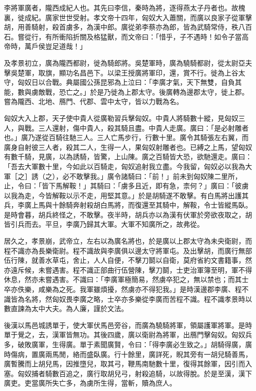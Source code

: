 
\begin{pinyinscope}
李將軍廣者，隴西成紀人也。其先曰李信，秦時為將，逐得燕太子丹者也。故槐裏，徙成紀。廣家世世受射。孝文帝十四年，匈奴大入蕭關，而廣以良家子從軍擊胡，用善騎射，殺首虜多，為漢中郎。廣從弟李蔡亦為郎，皆為武騎常侍，秩八百石。嘗從行，有所衝陷折關及格猛獸，而文帝曰：「惜乎，子不遇時！如令子當高帝時，萬戶侯豈足道哉！」

及孝景初立，廣為隴西都尉，徙為騎郎將。吳楚軍時，廣為驍騎都尉，從太尉亞夫擊吳楚軍，取旗，顯功名昌邑下。以梁王授廣將軍印，還，賞不行。徙為上谷太守，匈奴日以合戰。典屬國公孫昆邪為上泣曰：「李廣才氣，天下無雙，自負其能，數與虜敵戰，恐亡之。」於是乃徙為上郡太守。後廣轉為邊郡太守，徙上郡。嘗為隴西、北地、鴈門、代郡、雲中太守，皆以力戰為名。

匈奴大入上郡，天子使中貴人從廣勒習兵擊匈奴。中貴人將騎數十縱，見匈奴三人，與戰。三人還射，傷中貴人，殺其騎且盡。中貴人走廣。廣曰：「是必射雕者也。」廣乃遂從百騎往馳三人。三人亡馬步行，行數十里。廣令其騎張左右翼，而廣身自射彼三人者，殺其二人，生得一人，果匈奴射雕者也。已縛之上馬，望匈奴有數千騎，見廣，以為誘騎，皆驚，上山陳。廣之百騎皆大恐，欲馳還走。廣曰：「吾去大軍數十里，今如此以百騎走，匈奴追射我立盡。今我留，匈奴必以我為大軍［之］誘（之），必不敢擊我。」廣令諸騎曰：「前！」前未到匈奴陳二里所，止，令曰：「皆下馬解鞍！」其騎曰：「虜多且近，即有急，柰何？」廣曰：「彼虜以我為走，今皆解鞍以示不走，用堅其意。」於是胡騎遂不敢擊。有白馬將出護其兵，李廣上馬與十餘騎奔射殺胡白馬將，而復還至其騎中，解鞍，令士皆縱馬臥。是時會暮，胡兵終怪之，不敢擊。夜半時，胡兵亦以為漢有伏軍於旁欲夜取之，胡皆引兵而去。平旦，李廣乃歸其大軍。大軍不知廣所之，故弗從。

居久之，孝景崩，武帝立，左右以為廣名將也，於是廣以上郡太守為未央衛尉，而程不識亦為長樂衛尉。程不識故與李廣俱以邊太守將軍屯。及出擊胡，而廣行無部伍行陳，就善水草屯，舍止，人人自便，不擊刀鬬以自衛，莫府省約文書籍事，然亦遠斥候，未嘗遇害。程不識正部曲行伍營陳，擊刀鬬，士吏治軍簿至明，軍不得休息，然亦未嘗遇害。不識曰：「李廣軍極簡易，然虜卒犯之，無以禁也；而其士卒亦佚樂，咸樂為之死。我軍雖煩擾，然虜亦不得犯我。」是時漢邊郡李廣、程不識皆為名將，然匈奴畏李廣之略，士卒亦多樂從李廣而苦程不識。程不識孝景時以數直諫為太中大夫。為人廉，謹於文法。

後漢以馬邑城誘單于，使大軍伏馬邑旁谷，而廣為驍騎將軍，領屬護軍將軍。是時單于覺之，去，漢軍皆無功。其後四歲，廣以衛尉為將軍，出鴈門擊匈奴。匈奴兵多，破敗廣軍，生得廣。單于素聞廣賢，令曰：「得李廣必生致之。」胡騎得廣，廣時傷病，置廣兩馬閒，絡而盛臥廣。行十餘里，廣詳死，睨其旁有一胡兒騎善馬，廣暫騰而上胡兒馬，因推墮兒，取其弓，鞭馬南馳數十里，復得其餘軍，因引而入塞。匈奴捕者騎數百追之，廣行取胡兒弓，射殺追騎，以故得脫。於是至漢，漢下廣吏。吏當廣所失亡多，為虜所生得，當斬，贖為庶人。


\end{pinyinscope}
